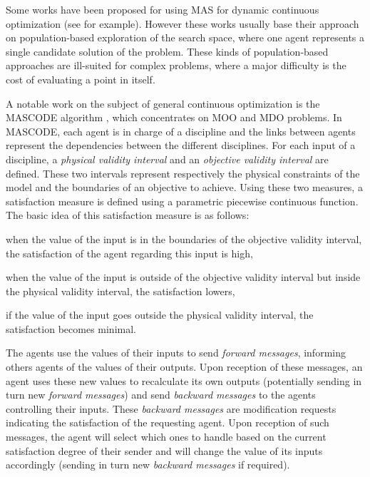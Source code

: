 Some works have been proposed for using MAS for dynamic continuous optimization (see \cite{lepagnot2010new} for example). However these works usually base their approach on population-based exploration of the search space, where one agent represents a single candidate solution of the problem. These kinds of population-based approaches are ill-suited for complex problems, where a major difficulty is the cost of evaluating a point in itself.

A notable work on the subject of general continuous optimization is the MASCODE algorithm \cite{welcomme2006self}, which concentrates on MOO and MDO problems. In MASCODE, each agent is in charge of a discipline and the links between agents represent the dependencies between the different disciplines. For each input of a discipline, a \emph{physical validity interval} and an \emph{objective validity interval} are defined. These two intervals represent respectively the physical constraints of the model and the boundaries of an objective to achieve. Using these two measures, a satisfaction measure is defined using a parametric piecewise continuous function. The basic idea of this satisfaction measure is as follows: 
\begin{compactitem}
\item when the value of the input is in the boundaries of the objective validity interval, the satisfaction of the agent regarding this input is high,
\item when the value of the input is outside of the objective validity interval but inside the physical validity interval, the satisfaction lowers,
\item if the value of the input goes outside the physical validity interval, the satisfaction becomes minimal.
\end{compactitem}

The agents use the values of their inputs to send \emph{forward messages}, informing others agents of the values of their outputs. Upon reception of these messages, an agent uses these new values to recalculate its own outputs (potentially sending in turn new \emph{forward messages}) and send \emph{backward messages} to the agents controlling their inputs. These \emph{backward messages} are modification requests indicating the satisfaction of the requesting agent. Upon reception of such messages, the agent will select which ones to handle based on the current satisfaction degree of their sender and will change the value of its inputs accordingly (sending in turn new \emph{backward messages} if required).

